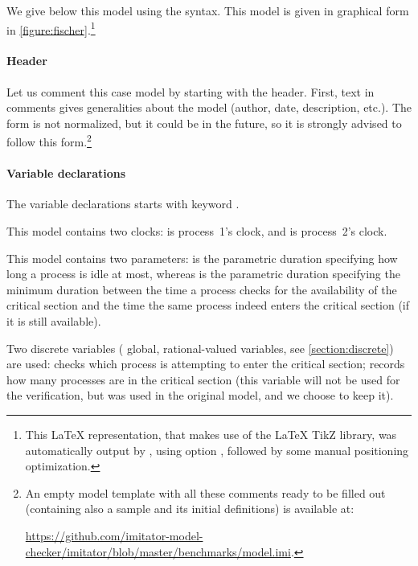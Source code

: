 We give below this model using the \imitator{} syntax.
This model is given in graphical form in \cref{figure:fischer}.\footnote{%
	This \LaTeX{} representation, that makes use of the \LaTeX{} TikZ library, was automatically output by \imitator{}, using option , followed by some manual positioning optimization.
}

\bigskip





\paragraph{Header}
Let us comment this case model by starting with the header.
First, text in comments gives generalities about the model (author, date, description, etc.).
The form is not normalized, but it could be in the future, so it is strongly advised to follow this form.\footnote{%
	An empty model template with all these comments ready to be filled out (containing also a sample \IPTA{} and its initial definitions) is available at:

	\url{https://github.com/imitator-model-checker/imitator/blob/master/benchmarks/model.imi}.
}

\paragraph{Variable declarations}
The variable declarations starts with keyword .

This model contains two clocks:  is process~1's clock, and  is process~2's clock.

This model contains two parameters:  is the parametric duration specifying how long a process is idle at most, whereas  is the parametric duration specifying the minimum duration between the time a process checks for the availability of the critical section and the time the same process indeed enters the critical section (if it is still available).

Two discrete variables (\ie{} global, rational-valued variables, see \cref{section:discrete}) are used:
 checks which process is attempting to enter the critical section;
 records how many processes are in the critical section (this variable will not be used for the verification, but was used in the original \pat{} model, and we choose to keep it).

